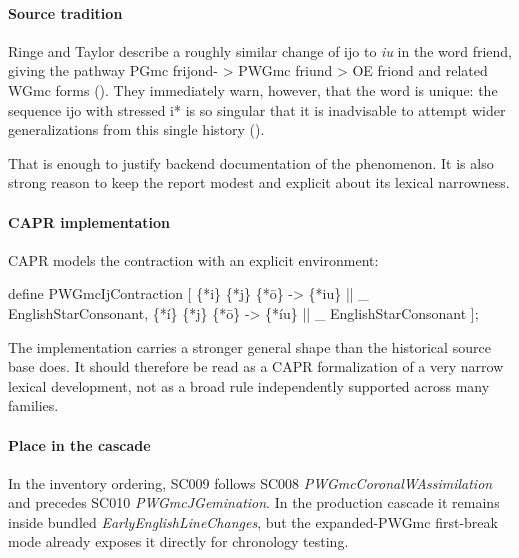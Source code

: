 \documentclass[
  british,
  a4paper,
]{article}
\newenvironment{Shaded}{}{}
\newcommand{\NormalTok}[1]{#1}
\begin{document}
\paragraph{Source tradition}\label{source-tradition-6}

Ringe and Taylor describe a roughly similar change of ijo to \emph{iu}
in the word friend, giving the pathway PGmc frijond- \textgreater{}
PWGmc friund \textgreater{} OE friond and related WGmc forms
(). They
immediately warn, however, that the word is unique: the sequence ijo
with stressed i* is so singular that it is inadvisable to attempt wider
generalizations from this single history
().

That is enough to justify backend documentation of the phenomenon. It is
also strong reason to keep the report modest and explicit about its
lexical narrowness.

\paragraph{CAPR implementation}\label{capr-implementation-6}

CAPR models the contraction with an explicit environment:

\begin{Shaded}
\begin{Highlighting}[]
\NormalTok{define PWGmcIjContraction [}
\NormalTok{    \{*i\} \{*j\} \{*ō\} {-}\textgreater{} \{*iu\} || \_ EnglishStarConsonant,}
\NormalTok{    \{*í\} \{*j\} \{*ō\} {-}\textgreater{} \{*íu\} || \_ EnglishStarConsonant}
\NormalTok{];}
\end{Highlighting}
\end{Shaded}

The implementation carries a stronger general shape than the historical
source base does. It should therefore be read as a CAPR formalization of
a very narrow lexical development, not as a broad rule independently
supported across many families.

\paragraph{Place in the cascade}\label{place-in-the-cascade-6}

In the inventory ordering, SC009 follows SC008
\emph{PWGmcCoronalWAssimilation} and precedes SC010
\emph{PWGmcJGemination}. In the production cascade it remains inside
bundled \emph{EarlyEnglishLineChanges}, but the expanded-PWGmc
first-break mode already exposes it directly for chronology testing.
\end{document}
